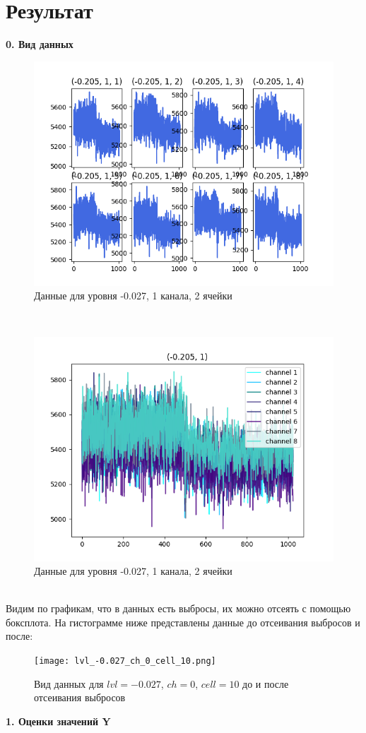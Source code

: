 \documentclass[10pt]{article}
\begin{document}
\section{Результат}
\textbf{0. Вид данных}\\
\begin{figure}[h!]
    \centering
    \includegraphics[width=0.6\linewidth]{plots_for_-0_027_all_channels.png}
    \caption{Данные для уровня -0.027, 1 канала, 2 ячейки}
\end{figure}\\
\begin{figure}[h!]
    \centering
    \includegraphics[width=0.6\linewidth]{all_channels_-0_027_fr_1.png}
    \caption{Данные для уровня -0.027, 1 канала, 2 ячейки}
\end{figure}\\
Видим по графикам, что в данных есть выбросы, их можно отсеять с помощью боксплота. На гистограмме ниже представлены данные до отсеивания выбросов и после:
\begin{figure}[h!]
    \centering
    \texttt{[image: lvl\_-0.027\_ch\_0\_cell\_10.png]}
    \caption{Вид данных для $lvl = -0.027$, $ch = 0$, $cell = 10$ до и после отсеивания выбросов}
    \label{fig:enter-label}
\end{figure}
\newpage
\hspace{-0.5cm}\textbf{1. Оценки значений Y}\\
\end{document}
